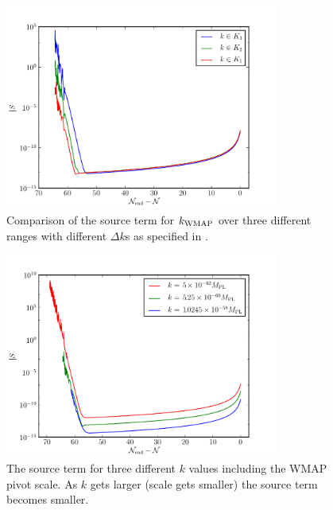 \begin{figure}
\centering
 \includegraphics[width=0.8\textwidth]{numerical/graphs/src-kwmap-3ranges-large}
\caption[Comparison of source term for different ranges]{Comparison of the source
term for $k_\mathrm{WMAP}$ over three different ranges with different $\Delta k$s as specified
in
.} 
\label{fig:src-kwmap-3ranges}
\end{figure}
% 
\begin{figure}
\centering
 \includegraphics[width=0.8\textwidth]{numerical/graphs/src-3ks-large}
\caption[Source term at three different $k$s]{The source term for three different $k$
values including the WMAP
pivot scale. As $k$
gets larger (scale gets smaller) the source term becomes smaller.}
\label{fig:src-3ks}
\end{figure}
% 
% 



